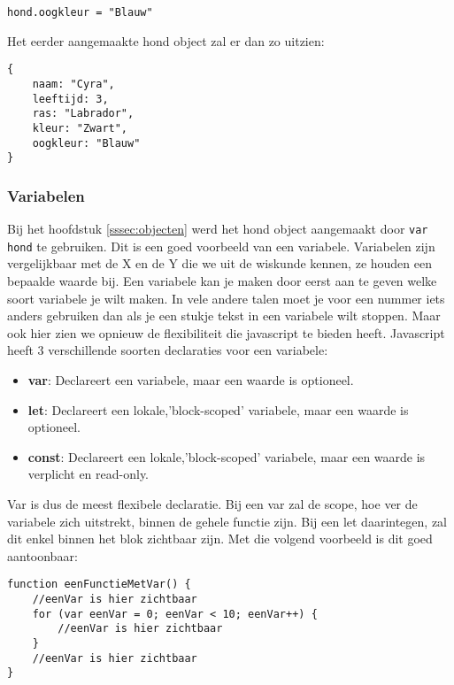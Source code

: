 \begin{lstlisting}[frame=single, caption=Eigenschap toevoegen aan en object]
hond.oogkleur = "Blauw"
\end{lstlisting}

Het eerder aangemaakte hond object zal er dan zo uitzien:

\begin{lstlisting}[frame=single, caption=Het nieuwe hond object]
{
	naam: "Cyra",
 	leeftijd: 3,
 	ras: "Labrador",
 	kleur: "Zwart",
 	oogkleur: "Blauw"
}
\end{lstlisting}

\subsubsection{Variabelen}
\label{sssec:variabelen}
Bij het hoofdstuk \ref{sssec:objecten} werd het hond object aangemaakt door \lstinline[basicstyle=\ttfamily\color{red}]|var hond| te gebruiken. Dit is een goed voorbeeld van een variabele. Variabelen zijn vergelijkbaar met de X en de Y die we uit de wiskunde kennen, ze houden een bepaalde waarde bij. Een variabele kan je maken door eerst aan te geven welke soort variabele je wilt maken. In vele andere talen moet je voor een nummer iets anders gebruiken dan als je een stukje tekst in een variabele wilt stoppen. Maar ook hier zien we opnieuw de flexibiliteit die javascript te bieden heeft. Javascript heeft 3 verschillende soorten declaraties voor een variabele:

\begin{itemize}
	\item \textbf{var}: Declareert een variabele, maar een waarde is optioneel.
	\item \textbf{let}: Declareert een lokale,'block-scoped' variabele, maar een waarde is optioneel.
	\item \textbf{const}: Declareert een lokale,'block-scoped' variabele, maar een waarde is verplicht en read-only.
\end{itemize}

Var is dus de meest flexibele declaratie. Bij een var zal de scope, hoe ver de variabele zich uitstrekt, binnen de gehele functie zijn. Bij een let daarintegen, zal dit enkel binnen het blok zichtbaar zijn. Met die volgend voorbeeld is dit goed aantoonbaar:

\begin{lstlisting}[frame=single, caption=Een functie met var]
function eenFunctieMetVar() {
	//eenVar is hier zichtbaar
	for (var eenVar = 0; eenVar < 10; eenVar++) {
		//eenVar is hier zichtbaar
	}
	//eenVar is hier zichtbaar
}
\end{lstlisting}

